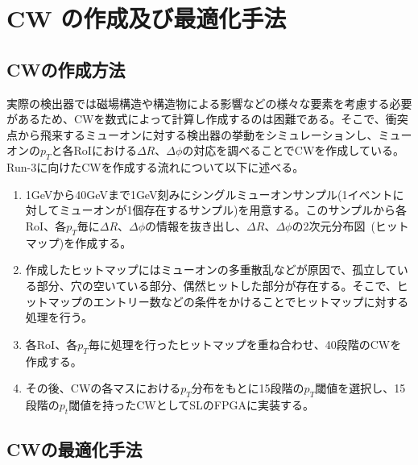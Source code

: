 \section{CW の作成及び最適化手法}\label{section:最適化}
\subsection{CWの作成方法}
実際の検出器では磁場構造や構造物による影響などの様々な要素を考慮する必要があるため、CWを数式によって計算し作成するのは困難である。そこで、衝突点から飛来するミューオンに対する検出器の挙動をシミュレーションし、ミューオンの$p_T$と各RoIにおける$\Delta R$、$\Delta \phi$の対応を調べることでCWを作成している。Run-3に向けたCWを作成する流れについて以下に述べる。
\begin{enumerate}\label{table:makeCW}
   \item 1GeVから40GeVまで1GeV刻みにシングルミューオンサンプル(1イベントに対してミューオンが1個存在するサンプル)を用意する。このサンプルから各RoI、各$p_T$毎に$\Delta R$、$\Delta \phi$の情報を抜き出し、$\Delta R$、$\Delta \phi$の2次元分布図~(ヒットマップ)を作成する。
   \item 作成したヒットマップにはミューオンの多重散乱などが原因で、孤立している部分、穴の空いている部分、偶然ヒットした部分が存在する。そこで、ヒットマップのエントリー数などの条件をかけることでヒットマップに対する処理を行う。
   \item 各RoI、各$p_T$毎に処理を行ったヒットマップを重ね合わせ、40段階のCWを作成する。
   \item その後、CWの各マスにおける$p_T$分布をもとに15段階の$p_T$閾値を選択し、15段階の$p_t$閾値を持ったCWとしてSLのFPGAに実装する。
\end{enumerate}



\subsection{CWの最適化手法}
